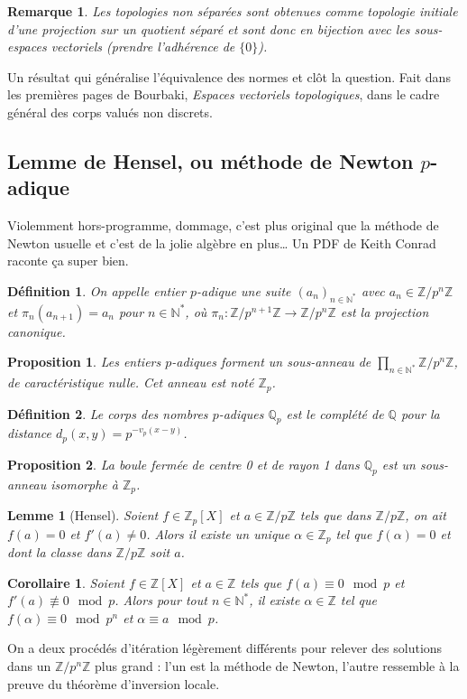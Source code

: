 \documentclass[a4paper, 11pt]{article}
\def\Z{\mathbb{Z}}
\def\N{\mathbb{N}}
\def\Q{\mathbb{Q}}
\newtheorem*{definition}{Définition}
\newtheorem*{proposition}{Proposition}
\newtheorem*{lemma}{Lemme}
\newtheorem*{remark}{Remarque}
\newtheorem*{corollary}{Corollaire}
\begin{document}
\begin{remark}
  Les topologies non séparées sont obtenues comme topologie initiale d'une
  projection sur un quotient séparé et sont donc en bijection avec les
  sous-espaces vectoriels (prendre l'adhérence de $\{0\}$).
\end{remark}

Un résultat qui généralise l'équivalence des normes et clôt la question. Fait
dans les premières pages de Bourbaki, \emph{Espaces vectoriels topologiques},
dans le cadre général des corps valués non discrets.

\subsection{Lemme de Hensel, ou méthode de Newton $p$-adique}

Violemment hors-programme, dommage, c'est plus original que la méthode de Newton
usuelle et c'est de la jolie algèbre en plus… Un PDF de Keith Conrad raconte ça
super bien.

\begin{definition}
  On appelle \emph{entier $p$-adique} une suite $(a_n)_{n \in \N^*}$
  avec $a_n \in \Z/p^n\Z$ et $\pi_n(a_{n+1}) = a_n$ pour $n \in \N^*$,
  où $\pi_n : \Z/p^{n+1}\Z \to \Z/p^n\Z$ est la projection canonique.
\end{definition}
\begin{proposition}
  Les entiers $p$-adiques forment un sous-anneau de
  $\prod_{n \in \N^*} \Z/p^n\Z$, de caractéristique nulle. Cet anneau
  est noté $\Z_p$.
\end{proposition}

\begin{definition}
  Le \emph{corps des nombres $p$-adiques} $\Q_p$ est le complété de
  $\Q$ pour la distance $d_p(x,y) = p^{-v_p(x-y)}$.
\end{definition}
\begin{proposition}
  La boule fermée de centre 0 et de rayon 1 dans $\Q_p$ est un
  sous-anneau isomorphe à $\Z_p$.
\end{proposition}

\begin{lemma}[Hensel]
  Soient $f \in \Z_p[X]$ et $a \in \Z/p\Z$ tels que dans $\Z/p\Z$, on
  ait $f(a) = 0$ et $f'(a) \neq 0$. Alors il existe un unique
  $\alpha \in \Z_p$ tel que $f(\alpha) = 0$ et dont la classe dans
  $\Z/p\Z$ soit $a$.
\end{lemma}

\begin{corollary}
  Soient $f \in \Z[X]$ et $a \in \Z$ tels que $f(a) \equiv 0 \mod p$
  et $f'(a) \not\equiv 0 \mod p$. Alors pour tout $n \in \N^*$, il
  existe $\alpha \in \Z$ tel que $f(\alpha) \equiv 0 \mod p^n$ et
  $\alpha \equiv a \mod p$.
\end{corollary}

On a deux procédés d'itération légèrement différents pour relever des solutions
dans un $\Z/p^n\Z$ plus grand : l'un est la méthode de Newton, l'autre ressemble
à la preuve du théorème d'inversion locale.
\end{document}
